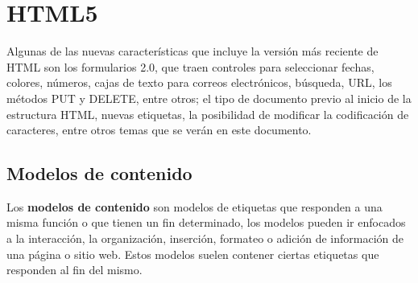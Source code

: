 \section{HTML5}
\hspace{0.55cm}Algunas de las nuevas características que incluye la versión más reciente de HTML son los formularios 2.0, que traen controles para seleccionar fechas, colores, números, cajas de texto para correos electrónicos, búsqueda, URL, los métodos PUT y DELETE, entre otros; el tipo de documento previo al inicio de la estructura HTML, nuevas etiquetas, la posibilidad de modificar la codificación de caracteres, entre otros temas que se verán en este documento.


\subsection{Modelos de contenido}
\hspace{0.55cm}Los \textbf{modelos de contenido} son modelos de etiquetas que responden a una misma función o que tienen un fin determinado, los modelos pueden ir enfocados a la interacción, la organización, inserción, formateo o adición de información de una página o sitio web. Estos modelos suelen contener ciertas etiquetas que responden al fin del mismo.


